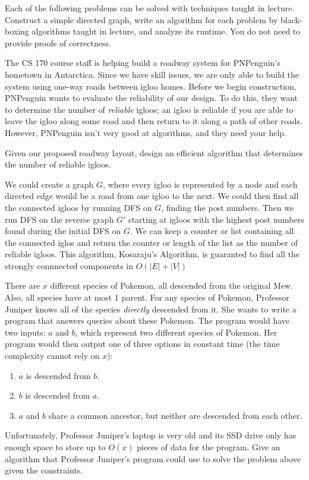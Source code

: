 \documentclass[11pt]{article}
\begin{document}
Each of the following problems can be solved with techniques taught in lecture. Construct a simple directed graph, write an algorithm for each problem by black-boxing algorithms taught in lecture, and analyze its runtime. You do not need to provide proofs of correctness.

\begin{subparts}

    \item The CS 170 course staff is helping build a roadway system for PNPenguin's hometown in Antarctica. Since we have skill issues, we are only able to build the system using one-way roads between igloo homes. Before we begin construction, PNPenguin wants to evaluate the reliability of our design. To do this, they want to determine the number of \textit{reliable} igloos; an igloo is reliable if you are able to leave the igloo along some road and then return to it along a path of other roads.
      However, PNPenguin isn't very good at algorithms, and they need your help.

    Given our proposed roadway layout, design an efficient algorithm that determines the number of reliable igloos.\\
    \begin{solution}
        We could create a graph $G$, where every igloo is represented by a node and each directed edge would be a road from one igloo to the next. We could then find all the connected igloos by running DFS on $G$, finding the post numbers.
        Then we run DFS on the reverse graph $G'$ starting at igloos with the highest post numbers found during the initial DFS on $G$. We can keep a counter or list containing all the connected iglos and return the counter or length of the list as the number of reliable igloos. 
        This algorithm, Kosaraju's Algorithm, is guaranted to find all the strongly connnected components in 
        $O(|E| + |V|)$
    \end{solution}
    \subpart There are $x$ different species of Pokemon, all descended from the original Mew. Also, all species have at most 1 parent. For any species of Pokemon, Professor Juniper knows all of the species \textit{directly} descended from it. She wants to write a program that answers queries about these Pokemon. The program would have two inputs: $a$ and $b$, which represent two different species of Pokemon. Her program would then output one of three options in constant time (the time complexity cannot rely on $x$): 
    \begin{enumerate}[(1)]
        \item $a$ is descended from $b$.
        \item $b$ is descended from $a$.
        \item $a$ and $b$ share a common ancestor, but neither are descended from each other.
    \end{enumerate}
    Unfortunately, Professor Juniper's laptop is very old and its SSD drive only has enough space to store up to $O(x)$ pieces of data for the program. Give an algorithm that Professor Juniper's program could use to solve the problem above given the constraints. 
    

\end{subparts}
\end{document}
